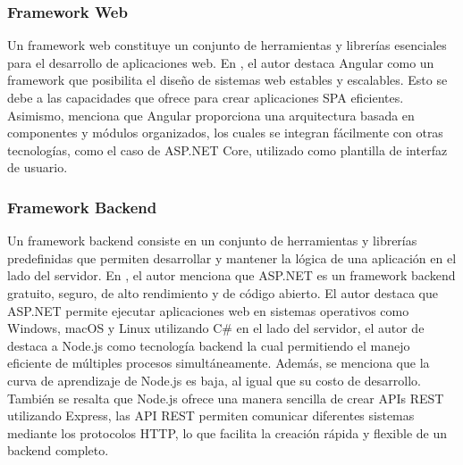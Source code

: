 \subsubsection{Framework Web}
Un framework web constituye un conjunto de herramientas y librerías esenciales para el desarrollo de aplicaciones web.
En \cite{chicaizavillegasAplicacionWebPara2023}, el autor destaca Angular como un framework que posibilita el diseño
de sistemas web estables y escalables. Esto se debe a las capacidades que ofrece para crear aplicaciones SPA eficientes.
Asimismo, menciona que Angular proporciona una arquitectura basada en componentes y módulos organizados, los cuales se
integran fácilmente con otras tecnologías, como el caso de ASP.NET Core, utilizado como plantilla de interfaz de usuario.

\subsubsection{Framework Backend}
Un framework backend consiste en un conjunto de herramientas y librerías predefinidas que permiten desarrollar y mantener
la lógica de una aplicación en el lado del servidor. En \cite{chicaizavillegasAplicacionWebPara2023}, el autor menciona
que ASP.NET es un framework backend gratuito, seguro, de alto rendimiento y de código abierto. El autor destaca que ASP.NET
permite ejecutar aplicaciones web en sistemas operativos como Windows, macOS y Linux utilizando C\# en el lado del servidor,
el autor de
\cite{chasichangoAplicacionMovilApoyo2022} destaca a Node.js como tecnología backend  la cual permitiendo el manejo eficiente
de múltiples procesos simultáneamente. Además, se menciona que la curva de aprendizaje de Node.js es baja, al igual que su
costo de desarrollo. También se resalta que Node.js ofrece una manera sencilla de crear APIs REST utilizando Express,
las API REST permiten comunicar diferentes sistemas mediante los protocolos HTTP, lo que facilita la creación rápida y
flexible de un backend completo.

